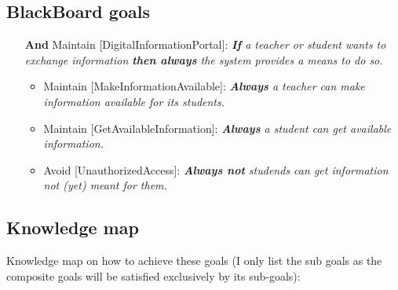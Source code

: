 \subsection*{BlackBoard goals}

\begin{itemize}
	\item[\textbf{And}] Maintain [DigitalInformationPortal]:
	\emph{\textbf{If} a teacher or student wants to exchange information \textbf{then always} the system provides a means to do so.}
	
	\begin{itemize}
		\item Maintain [MakeInformationAvailable]:		
		\emph{\textbf{Always} a teacher can make information available for its students.}
		
		\item Maintain [GetAvailableInformation]:
		\emph{\textbf{Always} a student can get available information.}
		
		\item Avoid [UnauthorizedAccess]:
		\emph{\textbf{Always not} studends can get information not (yet) meant for them.}
	\end{itemize}
\end{itemize}

\subsection*{Knowledge map}
Knowledge map on how to achieve these goals (I only list the sub goals as the composite goals will be satisfied exclusively by its sub-goals):

